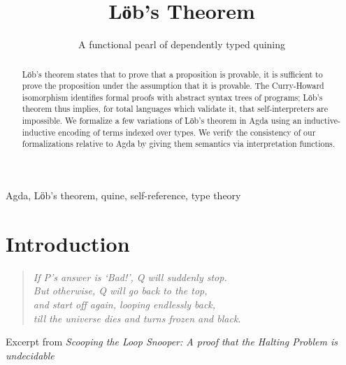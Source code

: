 

\title{Lӧb's Theorem}
\subtitle{A functional pearl of dependently typed quining}

\maketitle



\keywords
Agda, Lӧb's theorem, quine, self-reference, type theory


\begin{abstract}
Lӧb's theorem states that to prove that a proposition is provable, it
is sufficient to prove the proposition under the assumption that it is
provable.  The Curry-Howard isomorphism identifies formal proofs with
abstract syntax trees of programs; Lӧb's theorem thus implies, for
total languages which validate it, that self-interpreters are
impossible.  We formalize a few variations of Lӧb's theorem in Agda
using an inductive-inductive encoding of terms indexed over types.  We
verify the consistency of our formalizations relative to Agda by
giving them semantics via interpretation functions.
\end{abstract}


\section{Introduction}

\begin{quotation}
\noindent \textit{If P's answer is `Bad!', Q will suddenly stop. \\
But otherwise, Q will go back to the top, \\
and start off again, looping endlessly back, \\
till the universe dies and turns frozen and black.}
\end{quotation}
\begin{flushright}
Excerpt from \emph{Scooping the Loop Snooper: A proof that the Halting Problem is undecidable} \cite{loopsnoop}
\end{flushright}

